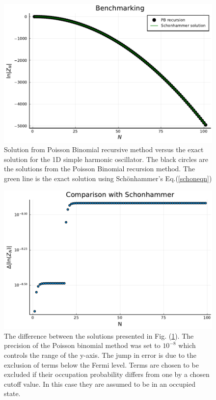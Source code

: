 \begin{figure}[H]
    \centering
    \includegraphics[scale=0.75]{figures/pdf/Benchmarking.pdf}
    \caption{Solution from Poisson Binomial recursive method versus the exact solution for the 1D simple harmonic oscillator. The black circles are the solutions from the Poisson Binomial recursion method. The green line is the exact solution using Sch\"onhammer's Eq.(\ref{schoneqn})}
    \label{fig: schon solution}
\end{figure}
\begin{figure}[H]
    \centering
    \includegraphics[scale=0.75]{figures/pdf/Benchdiff.pdf}
    \caption{The difference between the solutions presented in Fig. (\ref{fig: schon solution}). The precision of the Poisson binomial method was set to $10^{-8}$ which controls the range of the y-axis. The jump in error is due to the exclusion of terms below the Fermi level. Terms are chosen to be excluded if their occupation probability differs from one by a chosen cutoff value. In this case they are assumed to be in an occupied state. }
    \label{fig: schon diff}
\end{figure}


